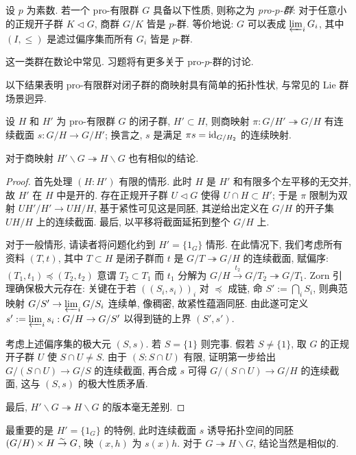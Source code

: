 \begin{definition}
	设 $p$ 为素数. 若一个 pro-有限群 $G$ 具备以下性质, 则称之为 \emph{pro-$p$-群}: 对于任意小的正规开子群 $K \lhd G$, 商群 $G/K$ 皆是 $p$-群. 等价地说: $G$ 可以表成 $\varprojlim_i G_i$, 其中 $(I, \leq)$ 是滤过偏序集而所有 $G_i$ 皆是 $p$-群.
\end{definition}

这一类群在数论中常见. 习题将有更多关于 pro-$p$-群的讨论.

以下结果表明 pro-有限群对闭子群的商映射具有简单的拓扑性状, 与常见的 Lie 群场景迥异.

\begin{lemma}\label{prop:profinite-section}
	设 $H$ 和 $H'$ 为 pro-有限群 $G$ 的闭子群, $H' \subset H$, 则商映射 $\pi: G/H' \twoheadrightarrow G/H$ 有连续截面 $s: G/H \to G/H'$; 换言之, $s$ 是满足 $\pi s = \mathrm{id}_{G/H_2}$ 的连续映射.
	
	对于商映射 $H' \backslash G \twoheadrightarrow H \backslash G$ 也有相似的结论.
\end{lemma}
\begin{proof}
	首先处理 $(H:H')$ 有限的情形. 此时 $H$ 是 $H'$ 和有限多个左平移的无交并, 故 $H'$ 在 $H$ 中是开的. 存在正规开子群 $U \lhd G$ 使得 $U \cap H \subset H'$; 于是 $\pi$ 限制为双射 $UH'/H' \to UH/H$, 基于紧性可见这是同胚, 其逆给出定义在 $G/H$ 的开子集 $UH/H$ 上的连续截面. 最后, 以平移将截面延拓到整个 $G/H$ 上.
	
	对于一般情形, 请读者将问题化约到 $H' = \{1_G\}$ 情形. 在此情况下, 我们考虑所有资料 $(T, t)$, 其中 $T \subset H$ 是闭子群而 $t$ 是 $G/T \twoheadrightarrow G/H$ 的连续截面, 赋偏序: $(T_1, t_1) \preceq (T_2, t_2)$ 意谓 $T_2 \subset T_1$ 而 $t_1$ 分解为 $G/H \xrightarrow{t_2} G/T_2 \twoheadrightarrow G/T_1$.  Zorn 引理确保极大元存在: 关键在于若 $((S_i, s_i))_i$ 对 $\preceq$ 成链, 命 $S' := \bigcap_i S_i$, 则典范映射 $G/S' \to \varprojlim_i G/S_i$ 连续单, 像稠密, 故紧性蕴涵同胚. 由此遂可定义 $s' := \varprojlim_i s_i: G/H \to G/S'$ 以得到链的上界 $(S', s')$.
	
	考虑上述偏序集的极大元 $(S, s)$. 若 $S = \{1\}$ 则完事. 假若 $S \neq \{1\}$, 取 $G$ 的正规开子群 $U$ 使 $S \cap U \neq S$. 由于 $(S : S \cap U)$ 有限, 证明第一步给出 $G/(S \cap U) \to G/S$ 的连续截面, 再合成 $s$ 可得 $G/(S \cap U) \to G/H$ 的连续截面, 这与 $(S, s)$ 的极大性质矛盾.
	
	最后, $H' \backslash G \twoheadrightarrow H \backslash G$ 的版本毫无差别.
\end{proof}

最重要的是 $H' = \{1_G\}$ 的特例, 此时连续截面 $s$ 诱导拓扑空间的同胚 $(G/H) \times H \stackrel{\sim}{\rightarrow} G$, 映 $(x, h)$ 为 $s(x)h$. 对于 $G \twoheadrightarrow H \backslash G$, 结论当然是相似的.

